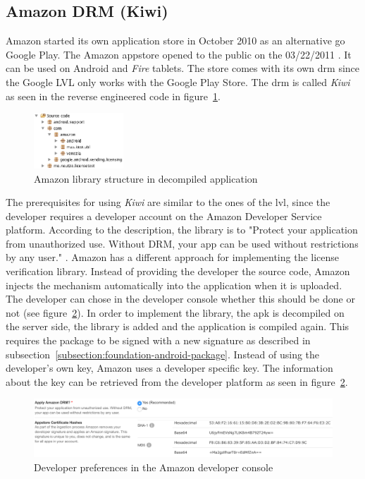 \subsection{Amazon DRM (Kiwi)} \label{section:license-amazon}
Amazon started its own application store in October 2010 \cite{amazonBeta} as an alternative go Google Play.
The Amazon appstore opened to the public on the 03/22/2011 \cite{amazonRelease}.
It can be used on Android and \textit{Fire} tablets.
The store comes with its own \gls{drm} since the Google LVL only works with the Google Play Store.
The \gls{drm} is called \textit{Kiwi} as seen in the reverse engineered code in figure~\ref{fig:amazonFolder}.
\newline
\begin{figure}[h]
    \centering
    \includegraphics[width=0.3\textwidth]{data/amazonFolder.png}
    \caption{Amazon library structure in decompiled application}
    \label{fig:amazonFolder}
\end{figure}
The prerequisites for using \textit{Kiwi} are similar to the ones of the \gls{lvl}, since the developer requires a developer account on the Amazon Developer Service platform.
According to the description, the library is to "Protect your application from unauthorized use. Without DRM, your app can be used without restrictions by any user." \cite{amazonDeveloper}.
\newline
Amazon has a different approach for implementing the license verification library.
Instead of providing the developer the source code, Amazon injects the mechanism automatically into the application when it is uploaded.
The developer can chose in the developer console whether this should be done or not (see figure~\ref{fig:amazon}).
In order to implement the library, the \gls{apk} is decompiled on the server side, the library is added and the application is compiled again.
This requires the package to be signed with a new signature as described in subsection~\ref{subsection:foundation-android-package}.
Instead of using the developer's own key, Amazon uses a developer specific key.
The information about the key can be retrieved from the developer platform as seen in figure~\ref{fig:amazon}. \cite{amazonDeveloper}
\newline
\begin{figure}[h]
    \centering
    \includegraphics[width=1\textwidth]{data/amazon.png}
    \caption{Developer preferences in the Amazon developer console \cite{amazonDeveloper}}
    \label{fig:amazon}
\end{figure}
